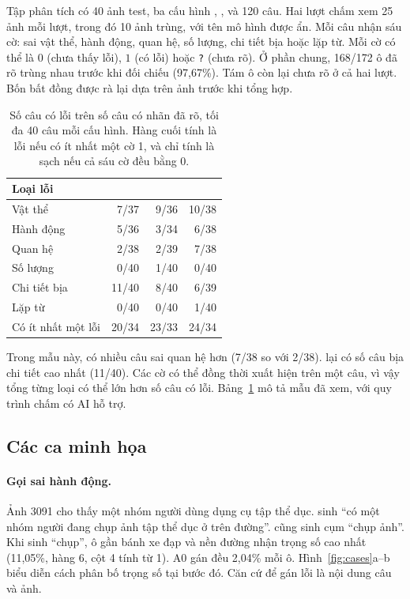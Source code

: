 Tập phân tích có 40 ảnh test, ba cấu hình \modelA{}, \modelB{}, \modelAz{} và 120 câu. Hai lượt chấm xem 25 ảnh mỗi lượt, trong đó 10 ảnh trùng, với tên mô hình được ẩn. Mỗi câu nhận sáu cờ: sai vật thể, hành động, quan hệ, số lượng, chi tiết bịa hoặc lặp từ. Mỗi cờ có thể là $0$ (chưa thấy lỗi), $1$ (có lỗi) hoặc \texttt{?} (chưa rõ). Ở phần chung, 168/172 ô đã rõ trùng nhau trước khi đối chiếu (97,67\%). Tám ô còn lại chưa rõ ở cả hai lượt. Bốn bất đồng được rà lại dựa trên ảnh trước khi tổng hợp.

\begin{table}[t]
  \centering
  \begin{tabular}{lrrr}
    \toprule
    Loại lỗi & \modelA{} & \modelAz{} & \modelB{} \\
    \midrule
    Vật thể              & 7/37  & 9/36  & 10/38 \\
    Hành động            & 5/36  & 3/34  & 6/38 \\
    Quan hệ              & 2/38  & 2/39  & 7/38 \\
    Số lượng             & 0/40  & 1/40  & 0/40 \\
    Chi tiết bịa         & 11/40 & 8/40  & 6/39 \\
    Lặp từ               & 0/40  & 0/40  & 1/40 \\
    \midrule
    Có ít nhất một lỗi   & 20/34 & 23/33 & 24/34 \\
    \bottomrule
  \end{tabular}
  \caption{Số câu có lỗi trên số câu có nhãn đã rõ, tối đa 40 câu mỗi cấu hình. Hàng cuối tính là lỗi nếu có ít nhất một cờ 1, và chỉ tính là sạch nếu cả sáu cờ đều bằng 0.}
  \label{tab:errors}
\end{table}

Trong mẫu này, \modelB{} có nhiều câu sai quan hệ hơn \modelA{} (7/38 so với 2/38). \modelA{} lại có số câu bịa chi tiết cao nhất (11/40). Các cờ có thể đồng thời xuất hiện trên một câu, vì vậy tổng từng loại có thể lớn hơn số câu có lỗi. Bảng~\ref{tab:errors} mô tả mẫu đã xem, với quy trình chấm có AI hỗ trợ.

\subsection{Các ca minh họa}
\label{sec:cases}

\paragraph{Gọi sai hành động.}
Ảnh 3091 cho thấy một nhóm người dùng dụng cụ tập thể dục. \modelA{} sinh “có một nhóm người đang chụp ảnh tập thể dục ở trên đường”. \modelAz{} cũng sinh cụm “chụp ảnh”. Khi \modelA{} sinh “chụp”, ô gần bánh xe đạp và nền đường nhận trọng số cao nhất (11,05\%, hàng 6, cột 4 tính từ 1). A0 gán đều 2,04\% mỗi ô. Hình~\ref{fig:cases}a--b biểu diễn cách phân bố trọng số tại bước đó. Căn cứ để gán lỗi là nội dung câu và ảnh.

